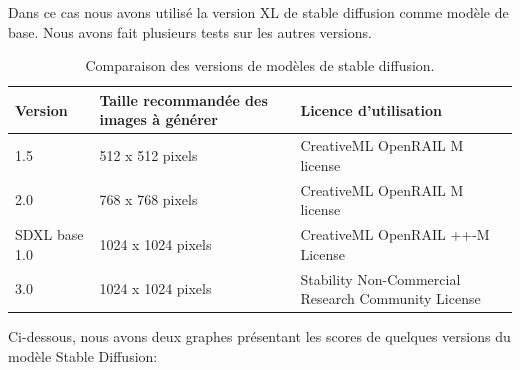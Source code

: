 Dans ce cas nous avons utilisé la version XL de stable diffusion comme modèle de base. Nous avons fait plusieurs tests sur les autres versions.

\begin{table}[H]
    \centering
    \begin{tabular}{|p{3cm}|p{4cm}|p{7cm}|}
        \hline
        \textbf{Version} & \textbf{Taille recommandée des images à générer} & \textbf{Licence d'utilisation}                      \\ \hline
        1.5              & 512 x 512 pixels                                 & CreativeML OpenRAIL M license                       \\ \hline
        2.0              & 768 x 768 pixels                                 & CreativeML OpenRAIL M license                       \\ \hline
        SDXL base 1.0    & 1024 x 1024 pixels                               & CreativeML OpenRAIL ++-M License                    \\ \hline
        3.0              & 1024 x 1024 pixels                               & Stability Non-Commercial Research Community License \\ \hline
    \end{tabular}
    \caption{Comparaison des versions de modèles de stable diffusion.\cite{wiki:stable_diffusion}}
    \label{tab:modeles}
\end{table}

Ci-dessous, nous avons deux graphes présentant les scores de quelques versions du modèle Stable Diffusion:

